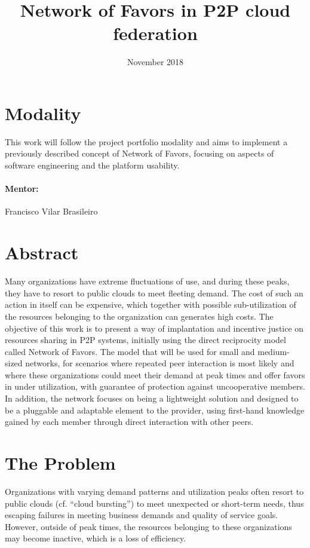 \documentclass{article}
\title{Network of Favors in P2P cloud federation}
\author{Gustavo Diniz Monteiro \\ \href{gustavo.monteiro@ccc.ufcg.edu.br, gustavo.d.monteiro@icloud.com} }
\date{November 2018}
\begin{document}
\maketitle

\section{Modality}

This work will follow the project portfolio modality and aims to implement a previously described concept of Network of Favors\cite{nof}, focusing on aspects of software engineering and the platform usability.

\paragraph{Mentor:} Francisco Vilar Brasileiro

\section{Abstract}
Many organizations have extreme fluctuations of use, and during these peaks, they have to resort to public clouds to meet fleeting demand. The cost of such an action in itself can be expensive, which together with possible sub-utilization of the resources belonging to the organization can generates high costs. The objective of this work is to present a way of implantation and incentive justice on resources sharing in P2P systems, initially using the direct reciprocity model called Network of Favors. The model that will be used for small and medium-sized networks, for scenarios where repeated peer interaction is most likely and where these organizations could meet their demand at peak times and offer favors in under utilization, with guarantee of protection against uncooperative members. In addition, the network focuses on being a lightweight solution and designed to be a pluggable and adaptable element to the provider, using first-hand knowledge gained by each member through direct interaction with other peers.

\section{The Problem}
Organizations with varying demand patterns and utilization peaks often resort to public clouds (cf. “cloud bursting”\cite{cloudburst}) to meet unexpected or short-term needs, thus escaping failures in meeting business demands and quality of service goals.
However, outside of peak times, the resources belonging to these organizations may become inactive, which is a loss of efficiency.
\end{document}
